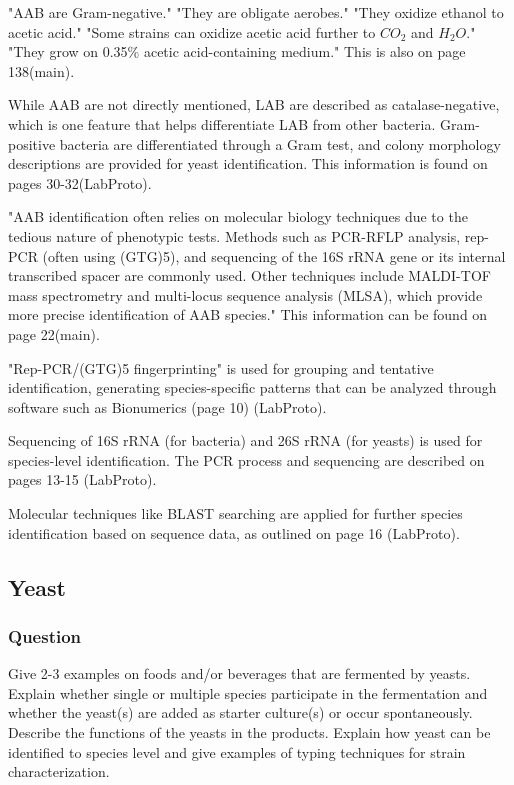 "AAB are Gram-negative."
"They are obligate aerobes."
"They oxidize ethanol to acetic acid."
"Some strains can oxidize acetic acid further to $CO_2$ and $H_2O$."
"They grow on 0.35\% acetic acid-containing medium."
This is also on page 138(main).

While AAB are not directly mentioned, LAB are described as catalase-negative, which is one feature that helps differentiate LAB from other bacteria. Gram-positive bacteria are differentiated through a Gram test, and colony morphology descriptions are provided for yeast identification. This information is found on pages 30-32(LabProto).

"AAB identification often relies on molecular biology techniques due to the tedious nature of phenotypic tests. Methods such as PCR-RFLP analysis, rep-PCR (often using (GTG)5), and sequencing of the 16S rRNA gene or its internal transcribed spacer are commonly used. Other techniques include MALDI-TOF mass spectrometry and multi-locus sequence analysis (MLSA), which provide more precise identification of AAB species."
This information can be found on page 22(main).

"Rep-PCR/(GTG)5 fingerprinting" is used for grouping and tentative identification, generating species-specific patterns that can be analyzed through software such as Bionumerics (page 10) (LabProto).

Sequencing of 16S rRNA (for bacteria) and 26S rRNA (for yeasts) is used for species-level identification. The PCR process and sequencing are described on pages 13-15 (LabProto).

Molecular techniques like BLAST searching are applied for further species identification based on sequence data, as outlined on page 16 (LabProto).

\subsection{Yeast}
\subsubsection*{Question}
Give 2-3 examples on foods and/or beverages that are fermented by yeasts. Explain whether single or multiple species participate in the fermentation and whether the yeast(s) are added as starter culture(s) or occur spontaneously. Describe the functions of the yeasts in the products. Explain how yeast can be identified to species level and give examples of typing techniques for strain characterization. 


